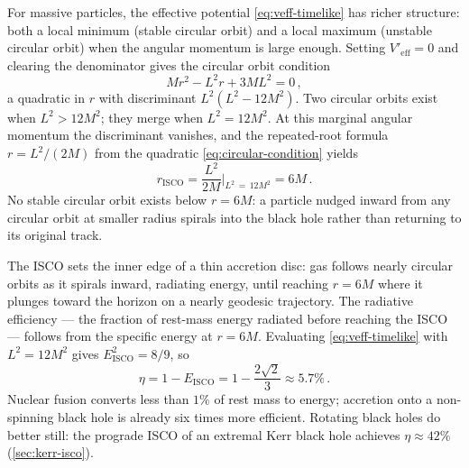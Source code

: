 For massive particles, the effective potential
\eqref{eq:veff-timelike} has richer structure: both a local minimum
(stable circular orbit) and a local maximum (unstable circular orbit)
when the angular momentum is large enough.  Setting
$V'_{\text{eff}} = 0$ and clearing the denominator gives the circular
orbit condition
%
\begin{equation}
  Mr^2 - L^2 r + 3ML^2 = 0 \,,
  \label{eq:circular-condition}
\end{equation}
%
a quadratic in $r$ with discriminant $L^2(L^2 - 12M^2)$.  Two
circular orbits exist when $L^2 > 12M^2$; they merge when
$L^2 = 12M^2$.  At this marginal angular momentum the discriminant
vanishes, and the repeated-root formula $r = L^2/(2M)$ from
the quadratic \cref{eq:circular-condition} yields
%
\begin{equation}
  r_{\text{ISCO}} = \frac{L^2}{2M}\bigg|_{L^2\,=\,12M^2}
  = 6M \,.
  \label{eq:isco-radius}
\end{equation}
%
No stable circular orbit exists below $r = 6M$: a particle nudged
inward from any circular orbit at smaller radius spirals into the
black hole rather than returning to its original track.

The ISCO sets the inner edge of a thin accretion disc: gas follows
nearly circular orbits as it spirals inward, radiating energy, until
reaching $r = 6M$ where it plunges toward the horizon on a nearly
geodesic trajectory.  The radiative efficiency --- the fraction of
rest-mass energy radiated before reaching the ISCO --- follows from the
specific energy at $r = 6M$.  Evaluating \cref{eq:veff-timelike} with
$L^2 = 12M^2$ gives $E_{\text{ISCO}}^2 = 8/9$, so
%
\begin{equation}
  \eta = 1 - E_{\text{ISCO}} = 1 - \frac{2\sqrt{2}}{3}
  \approx 5.7\% \,.
  \label{eq:isco-efficiency}
\end{equation}
%
Nuclear fusion converts less than $1\%$ of rest mass to energy;
accretion onto a non-spinning black hole is already six times more
efficient.  Rotating black holes do better still: the prograde ISCO
of an extremal Kerr black hole achieves
$\eta \approx 42\%$ (\cref{sec:kerr-isco}).

